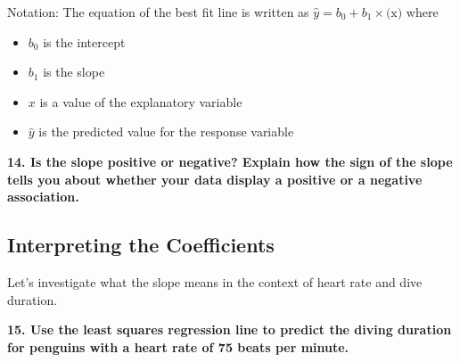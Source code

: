 \documentclass[
  letterpaper,
  DIV=11,
  numbers=noendperiod]{scrartcl}
\providecommand{\tightlist}{%
  \setlength{\itemsep}{0pt}\setlength{\parskip}{0pt}}\usepackage{longtable,booktabs,array}
\begin{document}
\vspace{0.25cm}


\vspace{0.25cm}

Notation: The equation of the best fit line is written as
\(\hat{y} = b_0 + b_1 \times \text{(x)}\) where

\begin{itemize}
\tightlist
\item
  \(b_0\) is the intercept
\item
  \(b_1\) is the slope
\item
  \(x\) is a value of the explanatory variable
\item
  \(\hat{y}\) is the predicted value for the response variable
\end{itemize}

\textbf{14. Is the slope positive or negative? Explain how the sign of
the slope tells you about whether your data display a positive or a
negative association.}


\vspace{0.5cm}


\hypertarget{interpreting-the-coefficients}{%
\subsection{Interpreting the
Coefficients}\label{interpreting-the-coefficients}}

Let's investigate what the slope means in the context of heart rate and
dive duration.

\textbf{15. Use the least squares regression line to predict the diving
duration for penguins with a heart rate of 75 beats per minute.}

\end{document}
